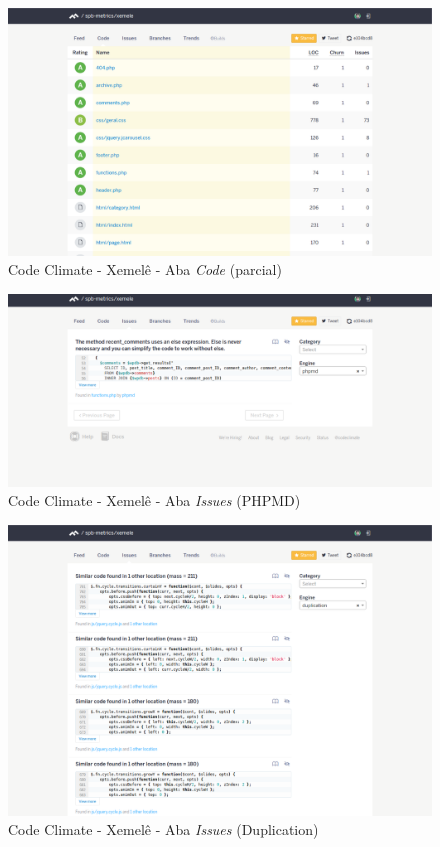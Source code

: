 \begin{figure}[!htb]
	\centering
    \includegraphics[keepaspectratio=true,scale=0.3]
    {figuras/codeclimate_code_tab.eps}
  \caption{Code Climate - Xemelê - Aba \textit{Code} (parcial)}
	\label{fig:codeclimate_code_tab}
\end{figure}

\begin{figure}[!htb]
	\centering
    \includegraphics[keepaspectratio=true,scale=0.3]
    {figuras/codeclimate_issues_tab_phpmd.eps}
  \caption{Code Climate - Xemelê - Aba \textit{Issues} (PHPMD)}
	\label{fig:codeclimate_issues_tab_phpmd}
\end{figure}

\begin{figure}[!htb]
	\centering
    \includegraphics[keepaspectratio=true,scale=0.3]
    {figuras/codeclimate_issues_tab_duplication.eps}
  \caption{Code Climate - Xemelê - Aba \textit{Issues} (Duplication)}
	\label{fig:codeclimate_issues_tab_duplication}
\end{figure}

